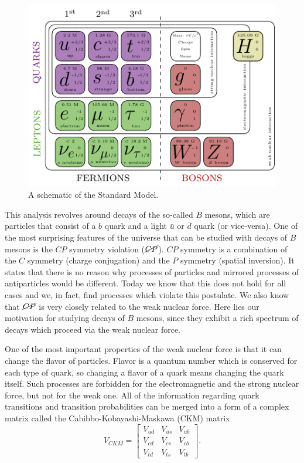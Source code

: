 \begin{figure}[!htb]
\centering
\includegraphics[scale=1.6]{texfig/SM}
\captionsetup{width=.8\linewidth}
\caption{A schematic of the Standard Model.}
\label{fig:sm}
\end{figure}

This analysis revolves around decays of the so-called $B$ mesons, which are particles that consist of a $b$ quark and a light $\bar u$ or $\bar d$ quark (or vice-versa). One of the most surprising features of the universe that can be studied with decays of $B$ mesons is the $CP$ symmetry violation ($\cancel{CP}$). $CP$ symmetry is a combination of the $C$ symmetry (charge conjugation) and the $P$ symmetry (spatial inversion). It states that there is no reason why processes of particles and mirrored processes of antiparticles would be different. Today we know that this does not hold for all cases and we, in fact, find processes which violate this postulate. We also know that $\cancel{CP}$ is very closely related to the weak nuclear force. Here lies our motivation for studying decays of $B$ mesons, since they exhibit a rich spectrum of decays which proceed via the weak nuclear force.

One of the most important properties of the weak nuclear force is that it can change the flavor of particles. Flavor is a quantum number which is conserved for each type of quark, so changing a flavor of a quark means changing the quark itself. Such processes are forbidden for the electromagnetic and the strong nuclear force, but not for the weak one. All of the information regarding quark transitions and transition probabilities can be merged into a form of a complex matrix called the Cabibbo-Kobayashi-Maskawa (CKM) matrix \cite{cabibbo1963unitary,kobayashi1973cp}
\begin{equation}
V_{CKM} = \begin{bmatrix}
    V_{ud} & V_{us} & V_{ub}\\
    V_{cd} & V_{cs} & V_{cb}\\
    V_{td} & V_{ts} & V_{tb}
\end{bmatrix}.
\end{equation}

